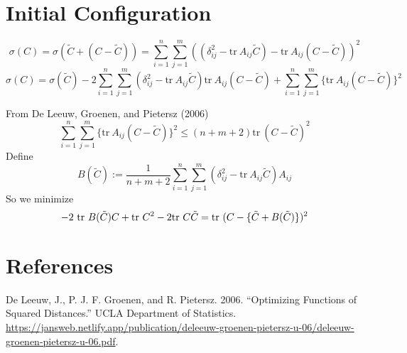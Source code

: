 \documentclass[
  12pt,
]{article}
\newlength{\cslhangindent}
\newenvironment{CSLReferences}[2] %
 {\begin{list}{}{%
  \setlength{\itemindent}{0pt}
  \setlength{\leftmargin}{0pt}
  \setlength{\parsep}{0pt}
  \ifodd #1
   \setlength{\leftmargin}{\cslhangindent}
   \setlength{\itemindent}{-1\cslhangindent}
  \fi
  \setlength{\itemsep}{#2\baselineskip}}}
 {\end{list}}
\begin{document}
\section{Initial Configuration}\label{initial-configuration}

\[
\sigma(C)=\sigma(\tilde C+(C-\tilde C))=\sum_{i=1}^n\sum_{j=1}^m((\delta_{ij}^2-\text{tr}\ A_{ij}\tilde C)-\text{tr}\ A_{ij}(C-\tilde C))^2
\]
\[
\sigma(C)=\sigma(\tilde C)-2\sum_{i=1}^n\sum_{j=1}^m(\delta_{ij}^2-\text{tr}\ A_{ij}\tilde C)\text{tr}\ A_{ij}(C-\tilde C)+\sum_{i=1}^n\sum_{j=1}^m\{\text{tr}\ A_{ij}(C-\tilde C)\}^2
\]

From De Leeuw, Groenen, and Pietersz (2006)
\[
\sum_{i=1}^n\sum_{j=1}^m\{\text{tr}\ A_{ij}(C-\tilde C)\}^2\leq (n+m+2)\text{tr}\ (C-\tilde C)^2
\]
Define
\[
B(\tilde C):=\frac{1}{n+m+2}\sum_{i=1}^n\sum_{j=1}^m(\delta_{ij}^2-\text{tr}\ A_{ij}\tilde C)A_{ij}
\]
So we minimize
\[
-2\ \text{tr}\ B(\tilde C)C+\text{tr}\ C^2-2\text{tr}\ C\tilde C=\\
\text{tr}\ (C-\{\tilde C + B(\tilde C)\})^2
\]

\section*{References}\label{references}

\label{refs}
\begin{CSLReferences}{1}{0}
De Leeuw, J., P. J. F. Groenen, and R. Pietersz. 2006. {``{Optimizing Functions of Squared Distances}.''} UCLA Department of Statistics. \url{https://jansweb.netlify.app/publication/deleeuw-groenen-pietersz-u-06/deleeuw-groenen-pietersz-u-06.pdf}.

\end{CSLReferences}
\end{document}
